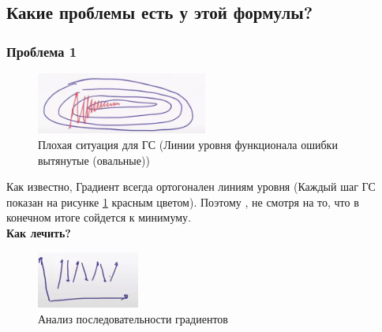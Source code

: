     \subsection{Какие проблемы есть у этой формулы?}
    \subsubsection{Проблема 1}
            \begin{figure}[H]
                \centering
                \includegraphics[width=0.5\textwidth]{images/4lecture/BadSituationGD.png}
                \caption{Плохая ситуация для ГС (Линии уровня функционала ошибки вытянутые (овальные))}
                \label{fig:badSitGD1}
             \end{figure}
             Как известно, Градиент всегда ортогонален линиям уровня (Каждый шаг ГС показан на рисунке \ref{fig:badSitGD1} красным цветом). Поэтому , не смотря на то, что в конечном итоге сойдется к минимуму.\\


             \textbf{Как лечить?}\\

             \begin{figure}[H]
                \centering
                \includegraphics[width=0.3\textwidth]{images/4lecture/FixFirstProblemGD.png}
                \caption{Анализ последовательности градиентов}
                \label{fig:fixGD1}
             \end{figure}


              \\

